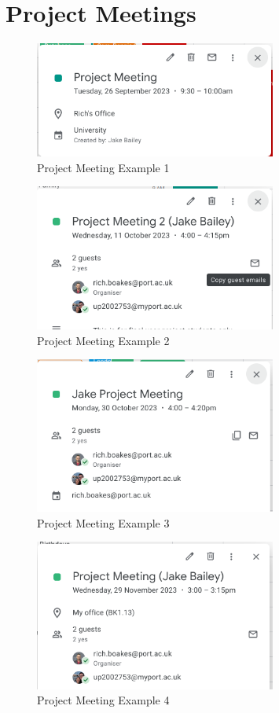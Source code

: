 \chapter{Project Meetings}
\begin{figure}[ht!]
    \centering
    \includegraphics[width=300px]{figures/project-meeting-1.png}
    \caption{Project Meeting Example 1}
    \label{fig:meeting-1}
\end{figure}

\begin{figure}[ht!]
    \centering
    \includegraphics[width=300px]{figures/project-meeting-2.png}
    \caption{Project Meeting Example 2}
    \label{fig:meeting-2}
\end{figure}

\begin{figure}[ht!]
    \centering
    \includegraphics[width=300px]{figures/project-meeting-3.png}
    \caption{Project Meeting Example 3}
    \label{fig:meeting-3}
\end{figure}

\begin{figure}[ht!]
    \centering
    \includegraphics[width=300px]{figures/project-meeting-4.png}
    \caption{Project Meeting Example 4}
    \label{fig:meeting-4}
\end{figure}

